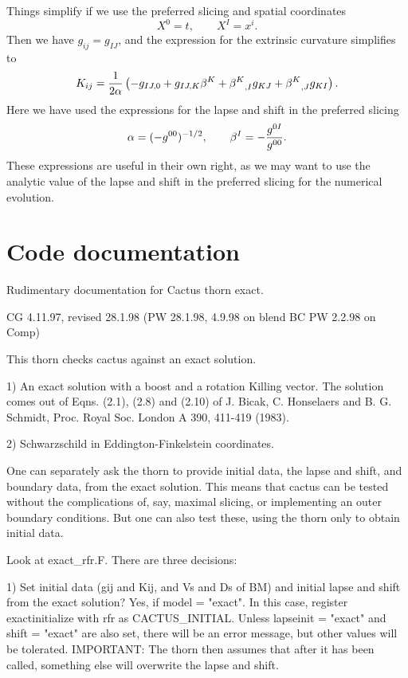 Things simplify if we use the preferred slicing and spatial
coordinates 
\begin{equation}
X^0 = t, \qquad X^I = x^i.
\end{equation}
Then we  have $g_{ij}=g_{IJ}$, and the expression for the extrinsic
curvature simplifies to
\begin{equation}
\label{Kij3}
K_{ij} = {1\over 2\alpha} \left(-g_{IJ,0} + g_{IJ,K} \beta^K
+ {\beta^K}_{,I} g_{KJ} + {\beta^K}_{,J} g_{KI} \right).
\end{equation}
Here we have used the expressions for the lapse and shift in the
preferred slicing
\begin{equation}
\alpha=(-g^{00})^{-1/2}, \qquad \beta^I = -{g^{0I}\over g^{00}}.
\end{equation}
These expressions are useful in their own right, as we may want to use
the analytic value of the lapse and shift in the preferred slicing for
the numerical evolution.


\section{Code documentation}


Rudimentary documentation for Cactus thorn exact.

CG 4.11.97, revised 28.1.98 (PW 28.1.98, 4.9.98 on blend BC PW 2.2.98 on Comp)

This thorn checks cactus against an exact solution.

1) An exact solution with a boost and a rotation Killing vector. The
solution comes out of Eqns. (2.1), (2.8) and (2.10) of J. Bicak,
C. Honselaers and B. G. Schmidt, Proc. Royal Soc. London A 390,
411-419 (1983).

2) Schwarzschild in Eddington-Finkelstein coordinates.

One can separately ask the thorn to provide initial data, the lapse
and shift, and boundary data, from the exact solution. This means that
cactus can be tested without the complications of, say, maximal
slicing, or implementing an outer boundary conditions. But one can
also test these, using the thorn only to obtain initial data.

Look at exact\_rfr.F. There are three decisions:

1) Set initial data (gij and Kij, and Vs and Ds of BM) and initial
lapse and shift from the exact solution? Yes, if model =
"exact". In this case, register exactinitialize with rfr as
CACTUS\_INITIAL.  Unless lapseinit = "exact" and shift = "exact"
are also set, there will be an error message, but other values will be
tolerated. IMPORTANT: The thorn then assumes that after it has been
called, something else will overwrite the lapse and shift.

